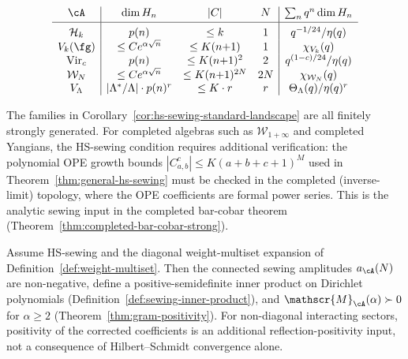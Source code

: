 \begin{corollary}%
\label{cor:hs-sewing-standard-landscape}%
%
\[
\begin{array}{c|ccc|c}
\cA & \dim H_n & |C| & N & \sum_n q^n\dim H_n
\\[2pt]\hline
\rule{0pt}{12pt}
\mathcal{H}_k & p(n) & \leq k & 1
 & q^{-1/24}/\eta(q) \\
V_k(\fg) & \leq Ce^{\alpha\sqrt{n}}
 & \leq K(n{+}1) & 1
 & \chi_{V_k}(q) \\
\mathrm{Vir}_c & p(n) & \leq K(n{+}1)^2 & 2
 & q^{(1-c)/24}/\eta(q) \\
\mathcal{W}_N & \leq Ce^{\alpha\sqrt{n}}
 & \leq K(n{+}1)^{2N} & 2N & \chi_{\mathcal{W}_N}(q) \\
V_\Lambda & |\Lambda^*/\Lambda|\cdot p(n)^r
 & \leq K \cdot r & r
 & \Theta_\Lambda(q)/\eta(q)^r
\end{array}
\]
\end{corollary}

\begin{remark}\label{rem:hs-sewing-completed}
The families in Corollary~\ref{cor:hs-sewing-standard-landscape} are
all finitely strongly generated. For completed algebras such as
$\mathcal{W}_{1+\infty}$ and completed Yangians, the HS-sewing
condition requires additional verification: the polynomial OPE growth
bounds $|C^c_{a,b}| \leq K(a{+}b{+}c{+}1)^M$ used in
Theorem~\ref{thm:general-hs-sewing} must be checked in the completed
(inverse-limit) topology, where the OPE coefficients are formal
power series. This is the analytic sewing
input in the completed bar-cobar theorem
(Theorem~\ref{thm:completed-bar-cobar-strong}).
\end{remark}

\begin{corollary}%
\label{cor:hs-implies-gram}%
%
Assume HS-sewing and the diagonal weight-multiset expansion of
Definition~\ref{def:weight-multiset}. Then the connected sewing
amplitudes $a_\cA(N)$ are non-negative, define a
positive-semidefinite inner product on Dirichlet polynomials
\textup{(}Definition~\textup{\ref{def:sewing-inner-product}}\textup{)},
and $\mathscr{M}_\cA(\alpha) \succ 0$ for $\alpha \geq 2$
\textup{(}Theorem~\textup{\ref{thm:gram-positivity}}\textup{)}.  For
non-diagonal interacting sectors, positivity of the corrected
coefficients is an additional reflection-positivity input, not a
consequence of Hilbert--Schmidt convergence alone.
\end{corollary}

